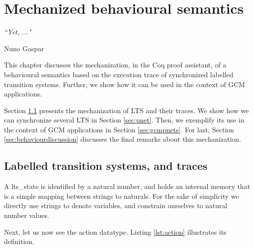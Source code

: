 
\chapter{Mechanized behavioural semantics} 
\label{chap:behaviour} 

\epigraph{\textit{“Yet, ..."}}{Nuno Gaspar}



\minitoc




	This chapter discusses the mechanization, in the Coq proof assistant, of a behavioural 
semantics based on the execution trace of synchronized labelled transition systems. Further, we show
how it can be used in the context of \ac{GCM} applications.

	Section \ref{sec:pLTS} presents the mechanization of \ac{LTS} and
their traces. We show how we can synchronize several \ac{LTS} in Section \ref{sec:pnet}.
Then, we exemplify its use in the context of \ac{GCM} applications in Section \ref{sec:gcmpnets}.
For last, Section \ref{sec:behaviourdiscussion} discusses the final remarks about this
mechanization.


\section{Labelled transition systems, and traces}
\label{sec:pLTS}

	
		
	
	
	\noindent A \textsf{lts\_state} is identified by a natural number, and holds an internal memory that is a
	simple mapping between strings to naturals. For the sake of simplicity we directly use strings to denote variables,
	and constrain ourselves to natural number values.
	
	Next, let us now see the \textsf{action} datatype. Listing \ref{lst:action} illustrates its definition.
	
			

